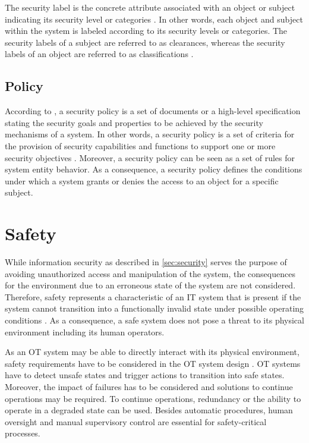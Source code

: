 The security label is the concrete attribute associated with an object or subject indicating its security level or categories \cite{JTF2020}.
In other words, each object and subject within the system is labeled according to its security levels or categories.
The security labels of a subject are referred to as clearances, whereas the security labels of an object are referred to as classifications \cite{CNSS2022}.

\subsection{Policy}
According to \citeauthor{Anderson2002} \cite{Anderson2002}, a security policy is a set of documents or a high-level specification stating the security goals and properties to be achieved by the security mechanisms of a system.
In other words, a security policy is a set of criteria for the provision of security capabilities and functions to support one or more security objectives \cite{JTF2020}.
Moreover, a security policy can be seen as a set of rules for system entity behavior.
As a consequence, a security policy defines the conditions under which a system grants or denies the access to an object for a specific subject. 

\section{Safety}
\label{sec:safety}
While information security as described in \autoref{sec:security} serves the purpose of avoiding unauthorized access and manipulation of the system, the consequences for the environment due to an erroneous state of the system are not considered.
Therefore, safety represents a characteristic of an IT system that is present if the system cannot transition into a functionally invalid state under possible operating conditions \cite{Eckert2023}.
As a consequence, a safe system does not pose a threat to its physical environment including its human operators.

As an OT system may be able to directly interact with its physical environment, safety requirements have to be considered in the OT system design \cite{Stouffer2023}.
OT systems have to detect unsafe states and trigger actions to transition into safe states.
Moreover, the impact of failures has to be considered and solutions to continue operations may be required.
To continue operations, redundancy or the ability to operate in a degraded state can be used.
Besides automatic procedures, human oversight and manual supervisory control are essential for safety-critical processes.

